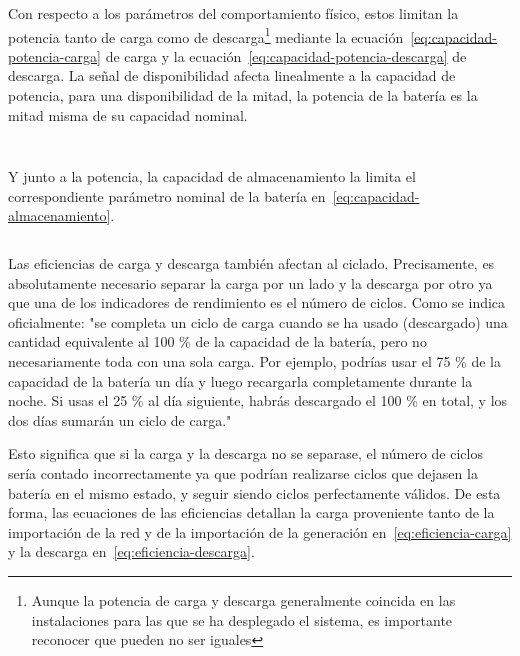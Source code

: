\begin{equation}
  \label{eq:neto-bruto}
\end{equation}

Con respecto a los parámetros del comportamiento físico, estos limitan la potencia tanto de carga como de descarga\footnote{Aunque la potencia de carga y descarga generalmente coincida en las instalaciones para las que se ha desplegado el sistema, es importante reconocer que pueden no ser iguales} mediante la ecuación~\ref{eq:capacidad-potencia-carga} de carga y la ecuación~\ref{eq:capacidad-potencia-descarga} de descarga. La señal de disponibilidad afecta linealmente a la capacidad de potencia, para una disponibilidad de la mitad, la potencia de la batería es la mitad misma de su capacidad nominal.

\begin{equation}
  \label{eq:capacidad-potencia-carga}
\end{equation}

\begin{equation}
  \label{eq:capacidad-potencia-descarga}
\end{equation}

Y junto a la potencia, la capacidad de almacenamiento la limita el correspondiente parámetro nominal de la batería en~\ref{eq:capacidad-almacenamiento}.

\begin{equation}
  \label{eq:capacidad-almacenamiento}
\end{equation}

Las eficiencias de carga y descarga también afectan al ciclado. Precisamente, es absolutamente necesario separar la carga por un lado y la descarga por otro ya que una de los indicadores de rendimiento es el número de ciclos. Como se indica oficialmente: "se completa un ciclo de carga cuando se ha usado (descargado) una cantidad equivalente al 100 \% de la capacidad de la batería, pero no necesariamente toda con una sola carga. Por ejemplo, podrías usar el 75 \% de la capacidad de la batería un día y luego recargarla completamente durante la noche. Si usas el 25 \% al día siguiente, habrás descargado el 100 \% en total, y los dos días sumarán un ciclo de carga."

Esto significa que si la carga y la descarga no se separase, el número de ciclos sería contado incorrectamente ya que podrían realizarse ciclos que dejasen la batería en el mismo estado, y seguir siendo ciclos perfectamente válidos. De esta forma, las ecuaciones de las eficiencias detallan la carga proveniente tanto de la importación de la red y de la importación de la generación en~\ref{eq:eficiencia-carga} y la descarga en~\ref{eq:eficiencia-descarga}.

